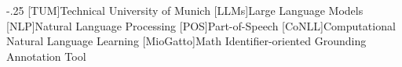 \documentclass[headsepline,footsepline,footinclude=false,oneside,fontsize=11pt,paper=a4,listof=totoc,bibliography=totoc]{scrbook} %
\begin{document}


\frontmatter{}





\tableofcontents{}

\mainmatter{}









\appendix{}


\begin{acronym}
	\itemsep-.25\baselineskip
	[TUM]{Technical University of Munich}
	[LLMs]{Large Language Models}
	[NLP]{Natural Language Processing}
	[POS]{Part-of-Speech}
	[CoNLL]{Computational Natural Language Learning}
	[MioGatto]{Math Identifier-oriented Grounding Annotation Tool}
\end{acronym}

\listoffigures{}
\listoftables{}
\printbibliography{}
\end{document}
